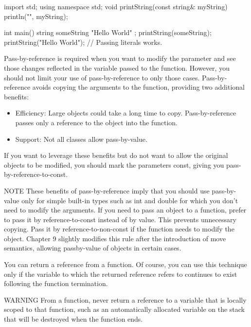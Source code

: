 \begin{cpp}
import std;
using namespace std;
void printString(const string& myString) { println("{}", myString); }

int main()
{
    string someString { "Hello World" };
    printString(someString);
    printString("Hello World"); // Passing literals works.
}
\end{cpp}


Pass-by-reference is required when you want to modify the parameter and see those changes reflected in the variable passed to the function. However, you should not limit your use of pass-by-reference to only those cases. Pass-by-reference avoids copying the arguments to the function, providing two additional benefits:

\begin{itemize}
\item
Efficiency: Large objects could take a long time to copy. Pass-by-reference passes only a reference to the object into the function.

\item
Support: Not all classes allow pass-by-value.
\end{itemize}

If you want to leverage these benefits but do not want to allow the original objects to be modified, you should mark the parameters const, giving you pass-by-reference-to-const.

\begin{myNotic}{NOTE}
These benefits of pass-by-reference imply that you should use pass-by-value only for simple built-in types such as int and double for which you don’t need to modify the arguments. If you need to pass an object to a function, prefer to pass it by reference-to-const instead of by value. This prevents unnecessary copying. Pass it by reference-to-non-const if the function needs to modify the object. Chapter 9 slightly modifies this rule after the introduction of move semantics, allowing passby-value of objects in certain cases.
\end{myNotic}


You can return a reference from a function. Of course, you can use this technique only if the variable to which the returned reference refers to continues to exist following the function termination.

\begin{myWarning}{WARNING}
From a function, never return a reference to a variable that is locally scoped to that function, such as an automatically allocated variable on the stack that will be destroyed when the function ends.
\end{myWarning}

